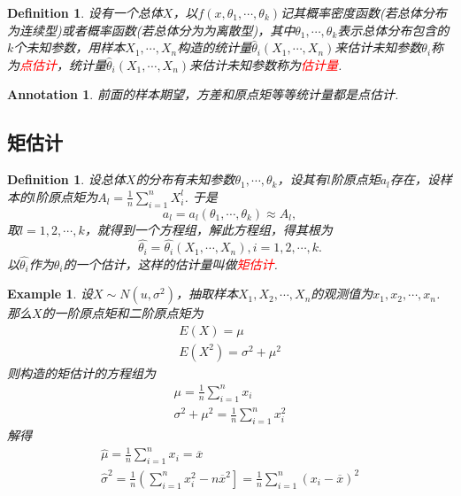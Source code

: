\documentclass{article}
\newtheorem{example}[theorem]{Example}
\newtheorem{definition}[theorem]{Definition}
\newtheorem{annotation}[theorem]{Annotation}
\newcommand{\redt}[1]{\textcolor{red}{#1}}
\begin{document}
\begin{definition}
\rm 设有一个总体$X$，以$f(x,\theta_1,\cdots,\theta_k)$记其概率密度函数(若总体分布为连续型)或者概率函数(若总体分为为离散型)，其中$\theta_1,\cdots,\theta_k$表示总体分布包含的$k$个未知参数，用样本$X_1,\cdots,X_n$构造的统计量$\widehat{\theta}_i(X_1,\cdots,X_n)$来估计未知参数$\theta_i$称为\redt{点估计}，统计量$\widehat{\theta}_i(X_1,\cdots,X_n)$来估计未知参数称为\redt{估计量}.
\end{definition}

\begin{annotation}
\rm 前面的样本期望，方差和原点矩等等统计量都是点估计. 
\end{annotation}

\subsection{矩估计}

\begin{definition}
\rm 设总体$X$的分布有未知参数$\theta_1,\cdots,\theta_k$，设其有$l$阶原点矩$a_l$存在，设样本的$l$阶原点矩为$A_l = \frac{1}{n}\sum\limits_{i = 1}^nX_i^l$. 于是
$$
a_l = a_l(\theta_1,\cdots,\theta_k) \approx A_l,
$$
取$l=1,2,\cdots,k$，就得到一个方程组，解此方程组，得其根为
$$
\widehat{\theta_i} = \widehat{\theta_i}(X_1,\cdots,X_n),i=1,2,\cdots,k.
$$
以$\widehat{\theta_i}$作为$\theta_i$的一个估计，这样的估计量叫做\redt{矩估计}.
\end{definition}

\begin{example}
\rm 设$X \sim N(u,\sigma^2)$，抽取样本$X_1,X_2,\cdots,X_n$的观测值为$x_1,x_2,\cdots,x_n$. 那么$X$的一阶原点矩和二阶原点矩为
$$
\begin{array}{ll}
E(X) = \mu \\
E(X^2) = \sigma^2 + \mu^2
\end{array}
$$
则构造的矩估计的方程组为
$$
\begin{array}{ll}
\mu = \frac{1}{n}\sum\limits_{i = 1}^n x_i \\
\sigma^2 + \mu^2 = \frac{1}{n}\sum\limits_{i = 1}^n x_i^2 
\end{array}
$$
解得
$$
\begin{array}{ll}
\widehat{\mu} = \frac{1}{n}\sum\limits_{i = 1}^n x_i =\overline{x} \\
\widehat{\sigma}^2 = \frac{1}{n}\left(\sum\limits_{i = 1}^n x_i^2 - n\overline{x}^2 \right] = \frac{1}{n}  \sum\limits_{i = 1}^n (x_i - \overline{x})^2
\end{array}
$$
\end{example}
\end{document}

